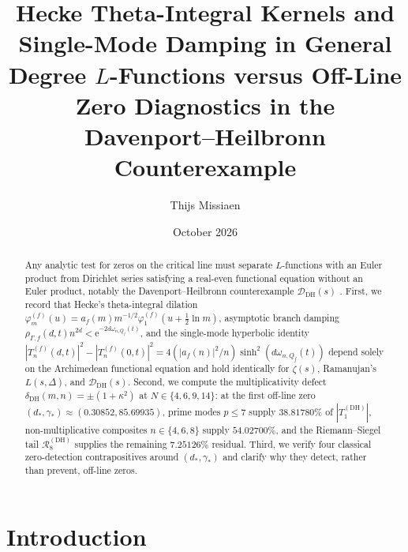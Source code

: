 \documentclass[11pt,reqno]{amsart}
\title[Hecke Kernels vs.\ Davenport--Heilbronn Diagnostics]{Hecke Theta-Integral Kernels and Single-Mode Damping in General Degree $L$-Functions versus Off-Line Zero Diagnostics in the Davenport--Heilbronn Counterexample}
\author{Thijs Missiaen}
\date{October 2026}
\theoremstyle{definition}
\theoremstyle{remark}
\numberwithin{equation}{section}
\newcommand{\ee}{\mathrm{e}}
\begin{document}
\begin{abstract}
Any analytic test for zeros on the critical line must separate $L$-functions with an Euler product from Dirichlet series satisfying a real-even functional equation without an Euler product, notably the Davenport--Heilbronn counterexample $\mathcal{D}_{\mathrm{DH}}(s)$ \cite{davenport1936,titchmarsh1986}. First, we record that Hecke's theta-integral dilation $\varphi_m^{(f)}(u) = a_f(m)m^{-1/2}\varphi_1^{(f)}(u + \frac{1}{2}\ln m)$, asymptotic branch damping $\rho_{\Gamma,f}(d,t)n^{2d} < \ee^{-2d\omega_{n,Q_f}(t)}$, and the single-mode hyperbolic identity $|T_n^{(f)}(d,t)|^2 - |T_n^{(f)}(0,t)|^2 = 4(|a_f(n)|^2/n)\sinh^2(d\omega_{n,Q_f}(t))$ depend solely on the Archimedean functional equation and hold identically for $\zeta(s)$, Ramanujan's $L(s,\Delta)$, and $\mathcal{D}_{\mathrm{DH}}(s)$. Second, we compute the multiplicativity defect $\delta_{\mathrm{DH}}(m,n) = \pm(1+\kappa^2)$ at $N \in \{4,6,9,14\}$: at the first off-line zero $(d_*,\gamma_*) \approx (0.30852, 85.69935)$, prime modes $p \le 7$ supply $38.81780\%$ of $|T_1^{(\mathrm{DH})}|$, non-multiplicative composites $n \in \{4,6,8\}$ supply $54.02700\%$, and the Riemann--Siegel tail $\mathcal{R}_8^{(\mathrm{DH})}$ supplies the remaining $7.25126\%$ residual. Third, we verify four classical zero-detection contrapositives around $(d_*,\gamma_*)$ and clarify why they detect, rather than prevent, off-line zeros.
\end{abstract}

\maketitle

\section{Introduction}
\label{sec:intro}
\end{document}
